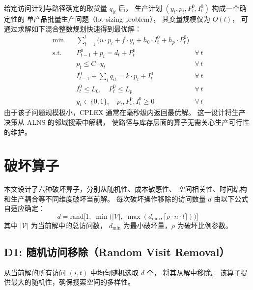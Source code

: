 \documentclass{article}
\begin{document}
给定访问计划与路径确定的取货量 $q_{it}$ 后，
生产计划 $(y_t, p_t, P^0_t, I^0_t)$ 构成一个确定性的
单产品批量生产问题（lot-sizing problem），
其变量规模仅为 $O(l)$，
可通过求解如下混合整数规划快速得到最优解：
\begin{align}
  \min \quad & \sum_{t=1}^{l} \bigl( u \cdot p_t + f \cdot y_t
    + h_0 \cdot I^0_t + h_p \cdot P^0_t \bigr) \\
  \text{s.t.} \quad
    & P^0_{t-1} + p_t = d_t + P^0_t
      & \forall\, t \label{eq:prod-finished-balance} \\
    & p_t \leq C \cdot y_t
      & \forall\, t \label{eq:prod-capacity} \\
    & I^0_{t-1} + \textstyle\sum_{i} q_{it} = k \cdot p_t + I^0_t
      & \forall\, t \label{eq:prod-raw-balance} \\
    & I^0_t \leq L_0,\quad P^0_t \leq L_p
      & \forall\, t \\
    & y_t \in \{0,1\},\quad p_t, P^0_t, I^0_t \geq 0
      & \forall\, t
\end{align}
由于该子问题规模极小，CPLEX 通常在毫秒级内返回最优解。
这一设计将生产决策从 ALNS 的邻域搜索中解耦，
使路径与库存层面的算子无需关心生产可行性的维护。

\section{破坏算子}
\label{sec:alns-destroy}

本文设计了六种破坏算子，分别从随机性、成本敏感性、
空间相关性、时间结构和生产耦合等不同维度破坏当前解。
每次破坏操作移除的访问数量 $d$ 由以下公式自适应确定：
\begin{equation}
  d = \text{rand}\bigl[1, \;
      \min\bigl(|\mathcal{V}|, \;
      \max(d_{\min}, \lceil \rho \cdot n \cdot l \rceil)\bigr)\bigr]
  \label{eq:destroy-count}
\end{equation}
其中 $|\mathcal{V}|$ 为当前解中的总访问数，
$d_{\min}$ 为最小破坏量，$\rho$ 为破坏比例参数。

\subsection{D1: 随机访问移除（Random Visit Removal）}

从当前解的所有访问 $(i,t)$ 中均匀随机选取 $d$ 个，
将其从解中移除。
该算子提供最大的随机性，确保搜索空间的多样性。
\end{document}
